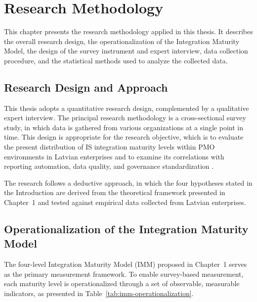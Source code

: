 \chapter{Research Methodology}
\label{chap:analysis}

This chapter presents the research methodology applied in this thesis. It describes
the overall research design, the operationalization of the Integration Maturity Model,
the design of the survey instrument and expert interview, data collection procedure,
and the statistical methods used to analyze the collected data.

\section{Research Design and Approach}
\label{sec:design}

This thesis adopts a quantitative research design, complemented by a qualitative
expert interview. The principal research methodology is a cross-sectional survey
study, in which data is gathered from various organizations at a single point in
time. This design is appropriate for the research objective, which is to evaluate
the present distribution of IS integration maturity levels within PMO environments
in Latvian enterprises and to examine its correlations with reporting automation,
data quality, and governance standardization \cite{saunders2019}.

The research follows a deductive approach, in which the four hypotheses stated
in the Introduction are derived from the theoretical framework presented in
Chapter~1 and tested against empirical data collected from Latvian enterprises.

\section{Operationalization of the Integration Maturity Model}
\label{sec:operationalization}

The four-level Integration Maturity Model (IMM) proposed in Chapter~1 serves as
the primary measurement framework. To enable survey-based measurement, each
maturity level is operationalized through a set of observable, measurable
indicators, as presented in Table~\ref{tab:imm-operationalization}.

